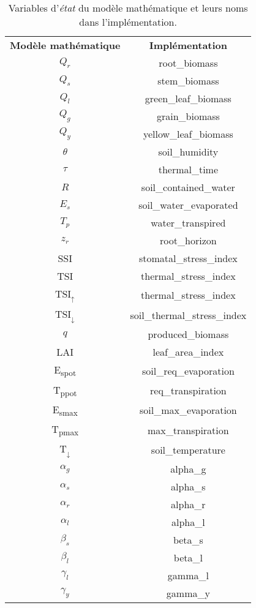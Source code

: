 
\begin{table}[h]
  \centering
  \begin{tabular}{c|c}
    \textbf{Modèle mathématique} & \textbf{Implémentation} \\
    $Q_r$ & root\_biomass \\
    $Q_s$ & stem\_biomass \\
    $Q_l$ & green\_leaf\_biomass \\
    $Q_g$ & grain\_biomass \\
    $Q_y$ & yellow\_leaf\_biomass \\
    $\theta$ & soil\_humidity \\
    $\tau$ & thermal\_time \\
    $R$ & soil\_contained\_water \\
    $E_s$ & soil\_water\_evaporated \\
    $T_p$ & water\_transpired \\
    $z_r$ & root\_horizon \\
    SSI & stomatal\_stress\_index \\
    TSI & thermal\_stress\_index \\
    TSI$_{\uparrow}$ & thermal\_stress\_index \\
    TSI$_{\downarrow}$ & soil\_thermal\_stress\_index \\
    $q$ & produced\_biomass \\
    LAI & leaf\_area\_index \\
    E\textsubscript{spot} & soil\_req\_evaporation \\
    T\textsubscript{ppot} & req\_transpiration \\
    E\textsubscript{smax} & soil\_max\_evaporation \\
    T\textsubscript{pmax} & max\_transpiration \\
    T$_{\downarrow}$ & soil\_temperature \\
    $\alpha_g$ & alpha\_g \\
    $\alpha_s$ & alpha\_s \\
    $\alpha_r$ & alpha\_r \\
    $\alpha_l$ & alpha\_l \\
    $\beta_s$ & beta\_s \\
    $\beta_l$ & beta\_l \\
    $\gamma_l$ & gamma\_l \\
    $\gamma_y$ & gamma\_y \\
  \end{tabular}
  \caption{Variables d'\emph{état} du modèle mathématique et leurs noms
  dans l'implémentation.}
  \label{table:state_var}
\end{table}

